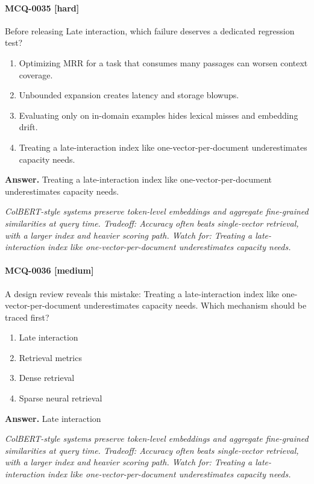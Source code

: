 \paragraph{MCQ-0035 [hard]} Before releasing Late interaction, which failure deserves a dedicated regression test?
\begin{enumerate}[label=\Alph*.]
\item Optimizing MRR for a task that consumes many passages can worsen context coverage.
\item Unbounded expansion creates latency and storage blowups.
\item Evaluating only on in-domain examples hides lexical misses and embedding drift.
\item Treating a late-interaction index like one-vector-per-document underestimates capacity needs.
\end{enumerate}
\noindent\textbf{Answer.} Treating a late-interaction index like one-vector-per-document underestimates capacity needs.
\par\textit{ColBERT-style systems preserve token-level embeddings and aggregate fine-grained similarities at query time. Tradeoff: Accuracy often beats single-vector retrieval, with a larger index and heavier scoring path. Watch for: Treating a late-interaction index like one-vector-per-document underestimates capacity needs.}
\paragraph{MCQ-0036 [medium]} A design review reveals this mistake: Treating a late-interaction index like one-vector-per-document underestimates capacity needs. Which mechanism should be traced first?
\begin{enumerate}[label=\Alph*.]
\item Late interaction
\item Retrieval metrics
\item Dense retrieval
\item Sparse neural retrieval
\end{enumerate}
\noindent\textbf{Answer.} Late interaction
\par\textit{ColBERT-style systems preserve token-level embeddings and aggregate fine-grained similarities at query time. Tradeoff: Accuracy often beats single-vector retrieval, with a larger index and heavier scoring path. Watch for: Treating a late-interaction index like one-vector-per-document underestimates capacity needs.}
